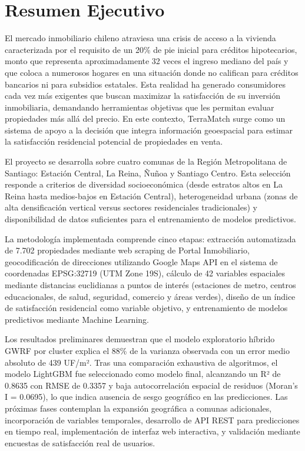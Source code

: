 \documentclass[11pt,letterpaper]{article}
\begin{document}

\newpage
\section*{Resumen Ejecutivo}

El mercado inmobiliario chileno atraviesa una crisis de acceso a la vivienda caracterizada por el requisito de un 20\% de pie inicial para créditos hipotecarios, monto que representa aproximadamente 32 veces el ingreso mediano del país y que coloca a numerosos hogares en una situación donde no califican para créditos bancarios ni para subsidios estatales. Esta realidad ha generado consumidores cada vez más exigentes que buscan maximizar la satisfacción de su inversión inmobiliaria, demandando herramientas objetivas que les permitan evaluar propiedades más allá del precio. En este contexto, TerraMatch surge como un sistema de apoyo a la decisión que integra información geoespacial para estimar la satisfacción residencial potencial de propiedades en venta.

El proyecto se desarrolla sobre cuatro comunas de la Región Metropolitana de Santiago: Estación Central, La Reina, Ñuñoa y Santiago Centro. Esta selección responde a criterios de diversidad socioeconómica (desde estratos altos en La Reina hasta medios-bajos en Estación Central), heterogeneidad urbana (zonas de alta densificación vertical versus sectores residenciales tradicionales) y disponibilidad de datos suficientes para el entrenamiento de modelos predictivos.

La metodología implementada comprende cinco etapas: extracción automatizada de 7.702 propiedades mediante web scraping de Portal Inmobiliario, geocodificación de direcciones utilizando Google Maps API en el sistema de coordenadas EPSG:32719 (UTM Zone 19S), cálculo de 42 variables espaciales mediante distancias euclidianas a puntos de interés (estaciones de metro, centros educacionales, de salud, seguridad, comercio y áreas verdes), diseño de un índice de satisfacción residencial como variable objetivo, y entrenamiento de modelos predictivos mediante Machine Learning.

Los resultados preliminares demuestran que el modelo exploratorio híbrido GWRF por cluster explica el 88\% de la varianza observada con un error medio absoluto de 439 UF/m². Tras una comparación exhaustiva de algoritmos, el modelo LightGBM fue seleccionado como modelo final, alcanzando un R² de 0.8635 con RMSE de 0.3357 y baja autocorrelación espacial de residuos (Moran's I = 0.0695), lo que indica ausencia de sesgo geográfico en las predicciones. Las próximas fases contemplan la expansión geográfica a comunas adicionales, incorporación de variables temporales, desarrollo de API REST para predicciones en tiempo real, implementación de interfaz web interactiva, y validación mediante encuestas de satisfacción real de usuarios.
\end{document}
